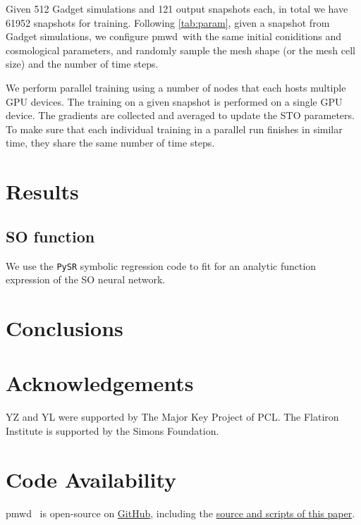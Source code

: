 \documentclass[usenatbib]{mnras}
\newcommand{\pmwd}{{\usefont{T1}{nova}{m}{sl}pmwd}}
\begin{document}
Given 512 Gadget simulations and 121 output snapshots each, in total we have
61952 snapshots for training.
Following \autoref{tab:param}, given a snapshot from Gadget simulations, we
configure \pmwd\ with the same initial coniditions and cosmological parameters,
and randomly sample the mesh shape (or the mesh cell size) and the number of
time steps.

We perform parallel training using a number of nodes that each hosts multiple
GPU devices.
The training on a given snapshot is performed on a single GPU device.
The gradients are collected and averaged to update the STO parameters.
To make sure that each individual training in a parallel run finishes in similar
time, they share the same number of time steps.


\section{Results}

\subsection{SO function}

We use the \texttt{PySR} \citep{PySR, Cranmer2020} symbolic regression code to
fit for an analytic function expression of the SO neural network.



\section{Conclusions}


\section*{Acknowledgements}

YZ and YL were supported by The Major Key Project of PCL.
The Flatiron Institute is supported by the Simons Foundation.


\section*{Code Availability}

\pmwd\ \citep{Li2022b} is open-source on
\href{https://github.com/eelregit/pmwd}{GitHub}, including the
\href{https://github.com/eelregit/pmwd/tree/master/docs/papers/sto}{source
and scripts of this paper}.








\bsp  %
\label{lastpage}
\end{document}
